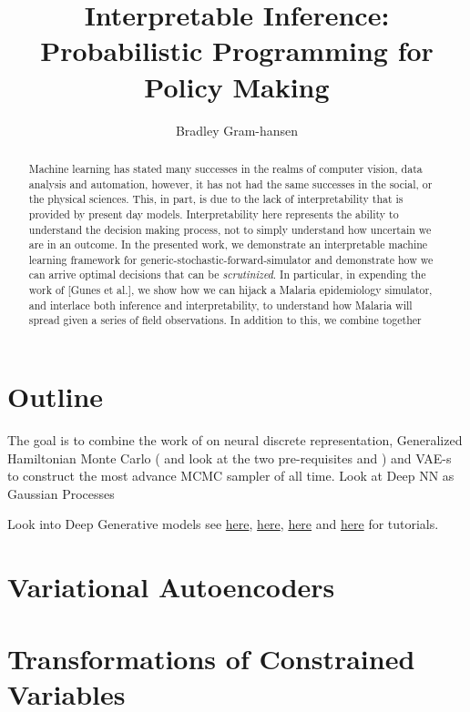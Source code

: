 \documentclass[]{scrartcl}
\title{Interpretable Inference: Probabilistic Programming for Policy Making}
\author{Bradley Gram-hansen}
\begin{document}
	
	\maketitle
	
	\begin{abstract}
		
		Machine learning has stated many successes in the realms of computer vision, data analysis and automation, however, it has not had the same successes in the
		social, or the physical sciences. This, in part, is due to the lack of interpretability that is provided by present day models. Interpretability here represents the ability to understand the decision making process, not to simply understand how uncertain we are in an outcome. 
		In the presented work, we demonstrate an interpretable machine learning framework for generic-stochastic-forward-simulator and demonstrate how we can arrive optimal decisions that can be \emph{scrutinized}. In particular, in expending the work of [Gunes et al.], we show how we can hijack a Malaria epidemiology simulator, and interlace both inference and interpretability, to understand how Malaria will spread given a series of field observations. In addition to this, we combine together 
	\end{abstract}
	
	\section{Outline}
	
	The goal is to combine the work of \citet{2017vanden} on neural discrete representation, Generalized Hamiltonian Monte Carlo ( and look at the two pre-requisites \citep{hoffman2017learning} and \citep{sohl2014hamiltonian}) and VAE-s to construct the most advance MCMC sampler of all time. Look at Deep NN as Gaussian Processes \citet{lee2017deep}
	
	Look into Deep Generative models see \href{http://www.cs.toronto.edu/~slwang/generative_model.pdf}{here}, \href{http://www.mit.edu/~9.520/spring10/Classes/class19_DBN_2010.pdf}{here}, \href{https://www.slideshare.net/mlreview/tutorial-on-deep-generative-models}{here} and \href{https://www.cs.cmu.edu/~rsalakhu/papers/annrev.pdf}{here} for tutorials. 
	
	\section{Variational Autoencoders}
	
	
	\section{Transformations of Constrained Variables}
	

	\newpage
	
	
\end{document}
